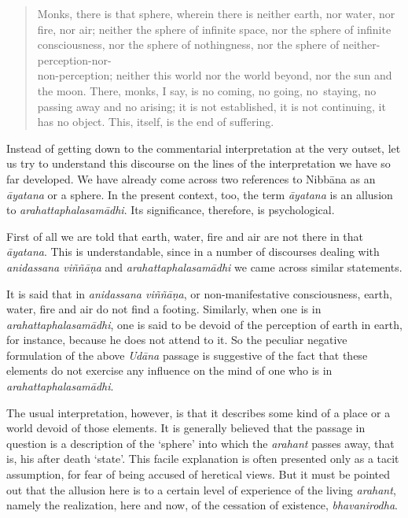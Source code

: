 \begin{quote}
Monks, there is that sphere, wherein there is neither earth, nor water, nor fire, nor air; neither the sphere of infinite space, nor the sphere of infinite consciousness, nor the sphere of nothingness, nor the sphere of neither-perception-nor-\\ non-perception; neither this world nor the world beyond, nor the sun and the moon. There, monks, I say, is no coming, no going, no~staying, no passing away and no arising; it is not established, it is not continuing, it has no object. This, itself, is the end of suffering.
\end{quote}

Instead of getting down to the commentarial interpretation at the very outset, let us try to understand this discourse on the lines of the interpretation we have so far developed. We have already come across two references to Nibbāna as an \emph{āyatana} or a sphere. In the present context, too, the term \emph{āyatana} is an allusion to \emph{arahattaphalasamādhi}. Its significance, therefore, is psychological.

First of all we are told that earth, water, fire and air are not there in that \emph{āyatana}. This is understandable, since in a number of discourses dealing with \emph{anidassana viññāṇa} and \emph{arahattaphalasamādhi} we came across similar statements.

It is said that in \emph{anidassana viññāṇa}, or non-manifestative consciousness, earth, water, fire and air do not find a footing. Similarly, when one is in \emph{arahattaphalasamādhi}, one is said to be devoid of the perception of earth in earth, for instance, because he does not attend to it. So the peculiar negative formulation of the above \emph{Udāna} passage is suggestive of the fact that these elements do not exercise any influence on the mind of one who is in \emph{arahattaphalasamādhi}.

The usual interpretation, however, is that it describes some kind of a place or a world devoid of those elements. It is generally believed that the passage in question is a description of the `sphere' into which the \emph{arahant} passes away, that is, his after death `state'. This facile explanation is often presented only as a tacit assumption, for fear of being accused of heretical views. But it must be pointed out that the allusion here is to a certain level of experience of the living \emph{arahant}, namely the realization, here and now, of the cessation of existence, \emph{bhavanirodha}.

